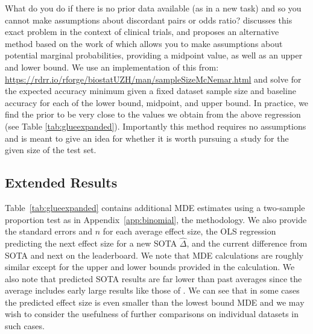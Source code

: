 \documentclass[11pt,a4paper]{article}
\begin{document}
What do you do if there is no prior data available (as in a new task) and so you cannot make assumptions about discordant pairs or odds ratio? \citet{lachenbruch1992sample} discusses this exact problem in the context of clinical trials, and proposes an alternative method based on the work of \cite{connett1987sample} which allows you to make assumptions about potential marginal probabilities, providing a midpoint value, as well as an upper and lower bound. We use an implementation of this from: \url{https://rdrr.io/rforge/biostatUZH/man/sampleSizeMcNemar.html} and solve for the expected accuracy minimum given a fixed dataset sample size and baseline accuracy for each of the lower bound, midpoint, and upper bound. In practice, we find the \citet{lachenbruch1992sample} prior to be very close to the values we obtain from the above regression (see Table \ref{tab:glueexpanded}). Importantly this method requires no assumptions and is meant to give an idea for whether it is worth pursuing a study for the given size of the test set. 


\subsection{Extended Results}
\label{app:glueexpandedres}

Table~\ref{tab:glueexpanded} contains additional MDE estimates using a two-sample proportion test as in Appendix~\ref{app:binomial}, the \citet{lachenbruch1992sample} methodology. We also provide the standard errors and $n$ for each average effect size, the OLS regression predicting the next effect size for a new SOTA $\widehat{\Delta}$, and the current difference from SOTA and next on the leaderboard. We note that MDE calculations are roughly similar except for the upper and lower bounds provided in the \citet{lachenbruch1992sample} calculation. We also note that predicted SOTA results are far lower than past averages since the average includes early large results like those of \citet{devlin2018bert}. We can see that in some cases the predicted effect size is even smaller than the lowest bound MDE and we may wish to consider the usefulness of further comparisons on individual datasets in such cases.
\end{document}
